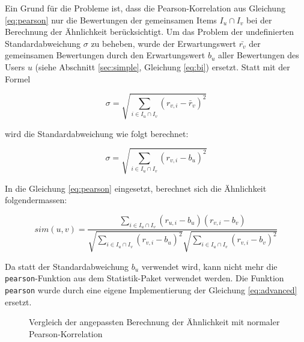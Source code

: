 \documentclass[a4paper, 12pt]{article}
\begin{document}
Ein Grund für die Probleme ist, dass die Pearson-Korrelation aus Gleichung \ref{eq:pearson} nur die Bewertungen der gemeinsamen Items  $I_u \cap I_v$ bei der Berechnung der Ähnlichkeit berücksichtigt. Um das Problem der undefinierten Standardabweichung $\sigma$ zu beheben, wurde der Erwartungswert $\bar{r_v}$ der gemeinsamen Bewertungen durch den Erwartungswert $b_u$ aller Bewertungen des Users $u$ (siehe Abschnitt \ref{sec:simple}, Gleichung \ref{eq:bi}) ersetzt. Statt mit der Formel

\begin{equation}
  \label{eq:naiv}
  \sigma = \sqrt{\sum_{i \in I_u \cap I_v}( r_{v,i} - \bar{r}_v)^2}
\end{equation}

wird die Standardabweichung wie folgt berechnet:

\begin{equation}
  \label{eq:naiv1}
  \sigma = \sqrt{\sum_{i \in I_u \cap I_v}( r_{v,i} - b_u)^2}
\end{equation}

In die Gleichung \ref{eq:pearson} eingesetzt, berechnet sich die Ähnlichkeit folgendermassen:

\begin{equation}
  \label{eq:advanced}
  sim(u,v)  = \frac{\sum_{i \in I_u \cap I_v}(r_{u,i} - b_u)(r_{v,i} - b_v)}{\sqrt{\sum_{i \in I_u \cap I_v}( r_{v,i} - b_u)^2}\sqrt{\sum_{i \in I_u \cap I_v}( r_{v,i} - b_v)^2}}
\end{equation}

Da statt der Standardabweichung $b_u$ verwendet wird, kann nicht mehr die \verb|pearson|-Funktion aus dem Statistik-Paket verwendet werden. Die Funktion \verb|pearson| wurde durch eine eigene Implementierung der Gleichung \ref{eq:advanced} ersetzt.

\begin{figure}
\centering
\caption{Vergleich der angepassten Berechnung der Ähnlichkeit mit normaler Pearson-Korrelation}
\label{fig:comparesim1}
\end{figure}
\end{document}
